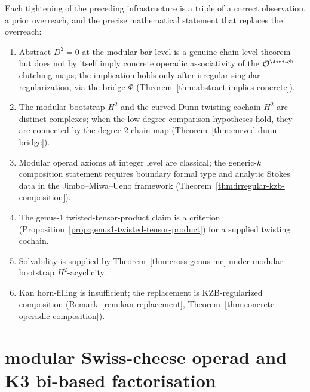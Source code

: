 \begin{remark}
\label{rem:first-principles-summary-modular}
Each tightening of the preceding infrastructure is a triple of a
correct observation, a prior overreach, and the precise mathematical
statement that replaces the overreach:
\begin{enumerate}\setlength\itemsep{2pt}
\item[\textbf{(Abstract vs concrete $D^2 = 0$.)}] Abstract $D^2 = 0$
 at the modular-bar level is a genuine chain-level theorem but does
 not by itself imply concrete operadic associativity of the
 $\mathcal{O}^{\Ainf\text{-ch}}$ clutching maps; the implication
 holds only after irregular-singular regularization, via the
 bridge $\Phi$ (Theorem~\ref{thm:abstract-implies-concrete}).
\item[\textbf{(Two $H^2$ obstructions, not one.)}] The modular-bootstrap
 $H^2$ and the curved-Dunn twisting-cochain $H^2$ are distinct
 complexes; when the low-degree comparison hypotheses hold, they are
 connected by the degree-\(2\) chain map
 (Theorem~\ref{thm:curved-dunn-bridge}).
\item[\textbf{(Generic non-integral level.)}] Modular operad axioms at
 integer level are classical; the generic-$k$ composition statement
 requires boundary formal type and analytic Stokes data in
 the Jimbo--Miwa--Ueno framework
 (Theorem~\ref{thm:irregular-kzb-composition}).
\item[\textbf{(Genus-$1$ twisted tensor criterion.)}] The genus-1
 twisted-tensor-product claim is a criterion
 (Proposition~\ref{prop:genus1-twisted-tensor-product}) for a
 supplied twisting cochain.
\item[\textbf{(Cross-genus Maurer--Cartan.)}] Solvability is supplied by
 Theorem~\ref{thm:cross-genus-mc} under modular-bootstrap
 \(H^2\)-acyclicity.
\item[\textbf{(Cross-genus coherence.)}] Kan horn-filling is
 insufficient; the replacement is KZB-regularized
 composition
 (Remark~\ref{rem:kan-replacement},
 Theorem~\ref{thm:concrete-operadic-composition}).
\end{enumerate}
\end{remark}

\section{modular Swiss-cheese operad and K3 bi-based factorisation}
\label{sec:msc-supplement}

